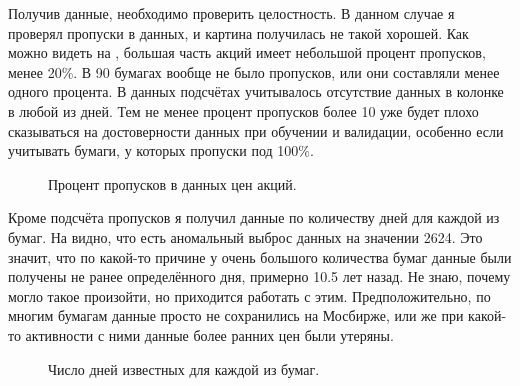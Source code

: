 \documentclass[12pt, a4paper]{article}
\begin{document}
Получив данные, необходимо проверить целостность. В данном случае я проверял пропуски в данных, и картина получилась не такой хорошей. Как можно видеть на , большая часть акций имеет небольшой процент пропусков, менее 20\%. В 90 бумагах вообще не было пропусков, или они составляли менее одного процента. В данных подсчётах учитывалось отсутствие данных в колонке  в любой из дней. Тем не менее процент пропусков более 10 уже будет плохо сказываться на достоверности данных при обучении и валидации, особенно если учитывать бумаги, у которых пропуски под 100\%.
\begin{figure}[H]
\caption{Процент пропусков в данных цен акций.}
\label{fig:miss_percents}
\end{figure}

Кроме подсчёта пропусков я получил данные по количеству дней для каждой из бумаг. На  видно, что есть аномальный выброс данных на значении 2624. Это значит, что по какой-то причине у очень большого количества бумаг данные были получены не ранее определённого дня, примерно 10.5 лет назад. Не знаю, почему могло такое произойти, но приходится работать с этим. Предположительно, по многим бумагам данные просто не сохранились на Мосбирже, или же при какой-то активности с ними данные более ранних цен были утеряны.
\begin{figure}[h!]
\caption{Число дней известных для каждой из бумаг.}
\label{fig:row_count}
\end{figure}
\end{document}
